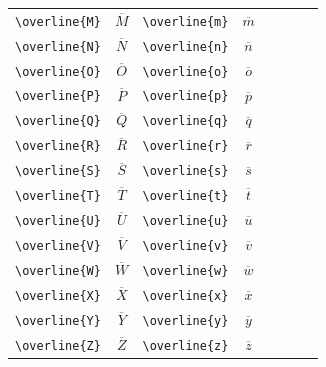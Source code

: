 \documentclass[12pt,a4paper]{article}
\begin{document}
\begin{longtable}{|l|c|l|c|c|l|c|c|}
\verb|\overline{M}| & $\overline{M}$  & \verb|\overline{m}| & $\overline{m}$  &                &                     &                 & \\
\verb|\overline{N}| & $\overline{N}$  & \verb|\overline{n}| & $\overline{n}$  &                &                     &                 & \\
\verb|\overline{O}| & $\overline{O}$  & \verb|\overline{o}| & $\overline{o}$  &                &                     &                 & \\
\verb|\overline{P}| & $\overline{P}$  & \verb|\overline{p}| & $\overline{p}$  &                &                     &                 & \\
\verb|\overline{Q}| & $\overline{Q}$  & \verb|\overline{q}| & $\overline{q}$  &                &                     &                 & \\
\verb|\overline{R}| & $\overline{R}$  & \verb|\overline{r}| & $\overline{r}$  &                &                     &                 & \\
\verb|\overline{S}| & $\overline{S}$  & \verb|\overline{s}| & $\overline{s}$  &                &                     &                 & \\
\verb|\overline{T}| & $\overline{T}$  & \verb|\overline{t}| & $\overline{t}$  &                &                     &                 & \\
\verb|\overline{U}| & $\overline{U}$  & \verb|\overline{u}| & $\overline{u}$  &                &                     &                 & \\
\verb|\overline{V}| & $\overline{V}$  & \verb|\overline{v}| & $\overline{v}$  &                &                     &                 & \\
\verb|\overline{W}| & $\overline{W}$  & \verb|\overline{w}| & $\overline{w}$  &                &                     &                 & \\
\verb|\overline{X}| & $\overline{X}$  & \verb|\overline{x}| & $\overline{x}$  &                &                     &                 & \\
\verb|\overline{Y}| & $\overline{Y}$  & \verb|\overline{y}| & $\overline{y}$  &                &                     &                 & \\
\verb|\overline{Z}| & $\overline{Z}$  & \verb|\overline{z}| & $\overline{z}$  &                &                     &                 & \\
\hline
\end{longtable}
\end{document}
